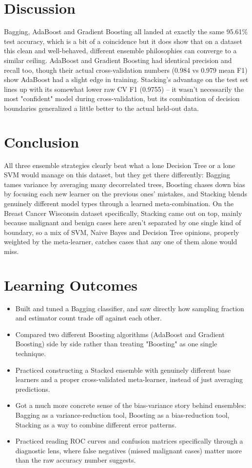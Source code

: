 \documentclass[12pt,a4paper]{article}
\begin{document}
\section{Discussion}
Bagging, AdaBoost and Gradient Boosting all landed at exactly the same 95.61\% test accuracy, which is
a bit of a coincidence but it does show that on a dataset this clean and well-behaved, different
ensemble philosophies can converge to a similar ceiling. AdaBoost and Gradient Boosting had identical
precision and recall too, though their actual cross-validation numbers (0.984 vs 0.979 mean F1) show
AdaBoost had a slight edge in training. Stacking's advantage on the test set lines up with its
somewhat lower raw CV F1 (0.9755) -- it wasn't necessarily the most "confident" model during
cross-validation, but its combination of decision boundaries generalized a little better to the actual
held-out data.

\section{Conclusion}
All three ensemble strategies clearly beat what a lone Decision Tree or a lone SVM would manage on
this dataset, but they get there differently: Bagging tames variance by averaging many decorrelated
trees, Boosting chases down bias by focusing each new learner on the previous ones' mistakes, and
Stacking blends genuinely different model types through a learned meta-combination. On the Breast
Cancer Wisconsin dataset specifically, Stacking came out on top, mainly because malignant and benign
cases here aren't separated by one single kind of boundary, so a mix of SVM, Naive Bayes and Decision
Tree opinions, properly weighted by the meta-learner, catches cases that any one of them alone would
miss.

\section{Learning Outcomes}
\begin{itemize}
\item Built and tuned a Bagging classifier, and saw directly how sampling fraction and estimator count
trade off against each other.
\item Compared two different Boosting algorithms (AdaBoost and Gradient Boosting) side by side rather
than treating "Boosting" as one single technique.
\item Practiced constructing a Stacked ensemble with genuinely different base learners and a proper
cross-validated meta-learner, instead of just averaging predictions.
\item Got a much more concrete sense of the bias-variance story behind ensembles: Bagging as a
variance-reduction tool, Boosting as a bias-reduction tool, Stacking as a way to combine different
error patterns.
\item Practiced reading ROC curves and confusion matrices specifically through a diagnostic lens,
where false negatives (missed malignant cases) matter more than the raw accuracy number suggests.
\end{itemize}
\end{document}
